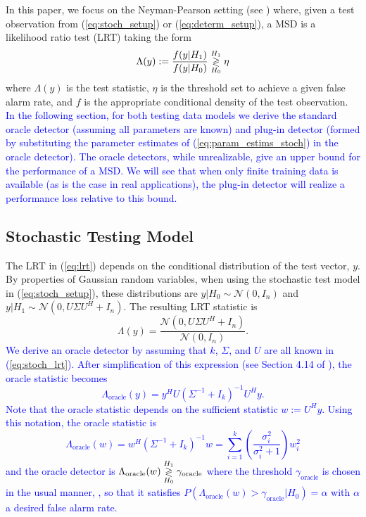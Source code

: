 In this paper, we focus on the  Neyman-Pearson setting (see \cite{van1968detection}) where, given a test observation from (\ref{eq:stoch_setup}) or (\ref{eq:determ_setup}), a MSD is a likelihood ratio test (LRT) taking the form
\begin{equation}\label{eq:lrt}
\Lambda(y):=\dfrac{f(y|H_1)}{f(y|H_0)} \detgtrless \eta
\end{equation}
where $\Lambda(y)$ is the test statistic, $\eta$ is the threshold set to achieve a given false alarm rate, and $f$ is the appropriate conditional density of the test observation. \textcolor{blue}{In the following section, for both testing data models we derive the standard oracle detector (assuming all parameters are known) and plug-in detector (formed by substituting the parameter estimates of (\ref{eq:param_estims_stoch}) in the oracle detector). The oracle detectors, while unrealizable, give an upper bound for the performance of a MSD. We will see that when only finite training data is available (as is the case in real applications), the plug-in detector will realize a performance loss relative to this bound.}

\subsection{Stochastic Testing Model}\label{sec:plugin_stoch}
The LRT in (\ref{eq:lrt}) depends on the conditional distribution of the test vector, $y$. By properties of Gaussian random variables, when using the stochastic test model in (\ref{eq:stoch_setup}), these distributions are $y|H_0\sim\mathcal{N}\left(0,I_n\right)$ and $y|H_1\sim\mathcal{N}\left(0, U\Sigma U^H +I_n\right)$. The resulting LRT statistic is
\begin{equation}\label{eq:stoch_lrt}
\Lambda(y)=\frac{\mathcal{N}(0,U\Sigma U^H + I_n)}{\mathcal{N}(0,I_n)}.
\end{equation}
\textcolor{blue}{We derive an oracle detector by assuming that $k$, $\Sigma$, and $U$ are all known in (\ref{eq:stoch_lrt}). After simplification of this expression (see Section 4.14 of \cite{scharf1991statistical}), the oracle statistic becomes
\begin{equation}\label{eq:oracle_stat_stoch_y}
\Lambda_{\text{oracle}}(y) = y^HU\left(\Sigma^{-1}+I_k\right)^{-1}U^Hy.
\end{equation}
Note that the oracle statistic depends on the sufficient statistic $w:=U^Hy$. Using this notation, the oracle statistic is
\begin{equation}\label{eq:oracle_stat_stoch_w}
\boxed{\Lambda_{\text{oracle}}(w) = w^H\left(\Sigma^{-1}+I_k\right)^{-1}w = \sum_{i=1}^k\left(\frac{\sigma_i^2}{\sigma_i^2+1}\right)w_i^2}
\end{equation}
and the oracle detector is $\Lambda_{\text{oracle}}(w) \overset{H_1}{\underset{H_0}{\gtrless}} \gamma_{\text{oracle}}$
where the threshold $\gamma_{\text{oracle}}$ is chosen in the usual manner, \ie, so that it satisfies $P(\Lambda_{\text{oracle}}(w)>\gamma_{\text{oracle}}|H_0)=\alpha$ with $\alpha$ a desired false alarm rate. }

